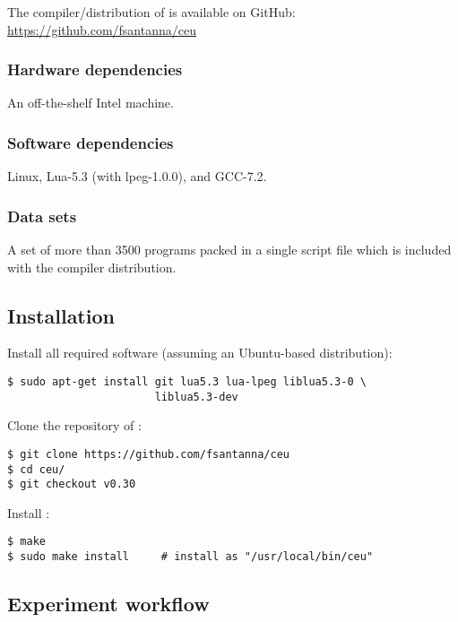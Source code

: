 {The compiler/distribution of \CEU is available on GitHub:
\url{https://github.com/fsantanna/ceu}

\subsubsection{Hardware dependencies}

An off-the-shelf Intel machine.

\subsubsection{Software dependencies}

Linux, Lua-5.3 (with lpeg-1.0.0), and GCC-7.2.

\subsubsection{Data sets}

A set of more than 3500 programs packed in a single script file which is
included with the compiler distribution.

\subsection{Installation}

Install all required software (assuming an Ubuntu-based distribution):

\begin{verbatim}
$ sudo apt-get install git lua5.3 lua-lpeg liblua5.3-0 \
                       liblua5.3-dev
\end{verbatim}

Clone the repository of \CEU:

\begin{verbatim}
$ git clone https://github.com/fsantanna/ceu
$ cd ceu/
$ git checkout v0.30
\end{verbatim}

Install \CEU:

\begin{verbatim}
$ make
$ sudo make install     # install as "/usr/local/bin/ceu"
\end{verbatim}

\subsection{Experiment workflow}

}
